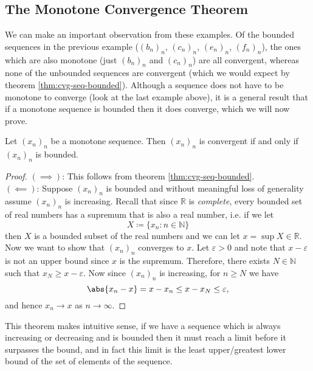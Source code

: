 \documentclass[../real_analysis.tex]{subfiles}
\begin{document}
        \subsection{The Monotone Convergence Theorem}\label{subsec:monotone-convergence-theorem}
            We can make an important observation from these examples. Of the bounded sequences in the previous example ($(b_n)_n$, $(c_n)_n$, $(e_n)_n$, $(f_n)_n$), the ones which are also monotone (just $(b_n)_n$ and $(c_n)_n$) are all convergent, whereas none of the unbounded sequences are convergent (which we would expect by theorem \ref{thm:cvg-seq-bounded}).
            Although a sequence does not have to be monotone to converge (look at the last example above), it is a general result that if a monotone sequence is bounded then it does converge, which we will now prove.
            \begin{theorem}\label{thm:MCT}
                Let $(x_n)_n$ be a monotone sequence. Then $(x_n)_n$ is convergent if and only if $(x_n)_n$ is bounded.
            \end{theorem}
            \begin{proof}
                $(\implies)$: This follows from theorem \ref{thm:cvg-seq-bounded}.\\
                $(\impliedby)$: Suppose $(x_n)_n$ is bounded and without meaningful loss of generality assume $(x_n)_n$ is increasing. Recall that since $\mathbb{R}$ is \textit{complete}, every bounded set of real numbers has a supremum that is also a real number, i.e. if we let
                \begin{equation}
                    X\coloneqq\{x_n:n\in\mathbb{N}\}
                \end{equation}
                then $X$ is a bounded subset of the real numbers and we can let $x=\sup X\in\mathbb{R}$. Now we want to show that $(x_n)_n$ converges to $x$. Let $\varepsilon>0$ and note that $x-\varepsilon$ is not an upper bound since $x$ is the supremum. Therefore, there exists $N\in\mathbb{N}$ such that $x_N\geq x-\varepsilon$. Now since $(x_n)_n$ is increasing, for $n\geq N$ we have
                \begin{equation}
                    \abs{x_n-x}=x-x_n\leq x-x_N\leq\varepsilon,
                \end{equation}
                and hence $x_n\to x$ as $n\to\infty$.
            \end{proof}
            This theorem makes intuitive sense, if we have a sequence which is always increasing or decreasing and is bounded then it must reach a limit before it surpasses the bound, and in fact this limit is the least upper/greatest lower bound of the set of elements of the sequence.
\end{document}

